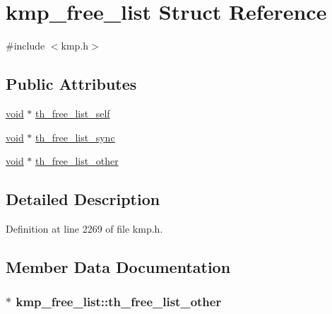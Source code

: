 \hypertarget{structkmp__free__list}{\section{kmp\-\_\-free\-\_\-list Struct Reference}
\label{structkmp__free__list}
}


{\ttfamily \#include $<$kmp.\-h$>$}

\subsection*{Public Attributes}
\begin{DoxyCompactItemize}
\item 
\hyperlink{ittnotify__static_8h_af941d56e55e3c5465135b60c4d6343ed}{void} $\ast$ \hyperlink{structkmp__free__list_a40d9e4ab1d810940d42f6aeb1284aec9}{th\-\_\-free\-\_\-list\-\_\-self}
\item 
\hyperlink{ittnotify__static_8h_af941d56e55e3c5465135b60c4d6343ed}{void} $\ast$ \hyperlink{structkmp__free__list_a94f818b577d97fd92da4ab1a83957877}{th\-\_\-free\-\_\-list\-\_\-sync}
\item 
\hyperlink{ittnotify__static_8h_af941d56e55e3c5465135b60c4d6343ed}{void} $\ast$ \hyperlink{structkmp__free__list_a2fc1d2cadbbd628f617ceb288c0189b5}{th\-\_\-free\-\_\-list\-\_\-other}
\end{DoxyCompactItemize}


\subsection{Detailed Description}


Definition at line 2269 of file kmp.\-h.



\subsection{Member Data Documentation}
\hypertarget{structkmp__free__list_a2fc1d2cadbbd628f617ceb288c0189b5}{
\subsubsection[{th\-\_\-free\-\_\-list\-\_\-other}]{$\ast$ kmp\-\_\-free\-\_\-list\-::th\-\_\-free\-\_\-list\-\_\-other}}\label{structkmp__free__list_a2fc1d2cadbbd628f617ceb288c0189b5}


